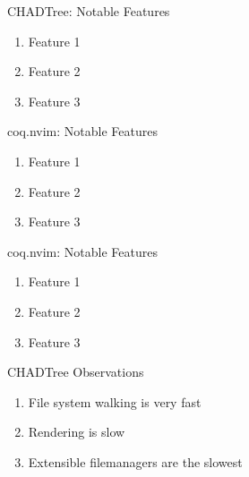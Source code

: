 \documentclass{beamer}
\begin{document}
\begin{frame}{CHADTree: Notable Features}


	\begin{enumerate}

		\item Feature 1

		\item Feature 2

		\item Feature 3

	\end{enumerate}


\end{frame}


\begin{frame}{coq.nvim: Notable Features}


	\begin{enumerate}

		\item Feature 1

		\item Feature 2

		\item Feature 3

	\end{enumerate}


\end{frame}


\begin{frame}{coq.nvim: Notable Features}


	\begin{enumerate}

		\item Feature 1

		\item Feature 2

		\item Feature 3

	\end{enumerate}


\end{frame}



\begin{frame}{CHADTree Observations}


	\begin{enumerate}

		\item File system walking is very fast

		\item Rendering is slow

		\item Extensible filemanagers are the slowest

	\end{enumerate}


\end{frame}
\end{document}
